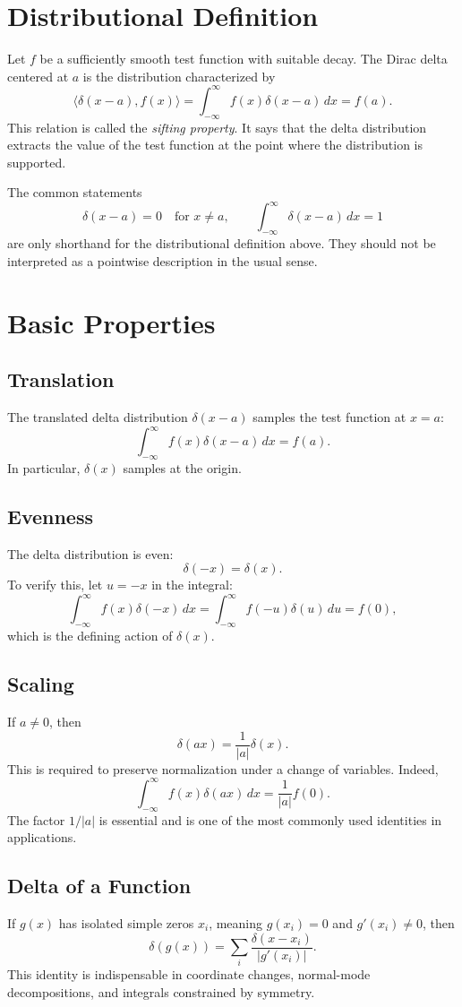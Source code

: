 \documentclass[12pt]{article}
\begin{document}
\section{Distributional Definition}
Let $f$ be a sufficiently smooth test function with suitable decay. The Dirac delta centered at $a$ is the distribution characterized by
\[
\langle \delta(x-a),f(x)\rangle = \int_{-\infty}^{\infty} f(x)\delta(x-a)\,dx = f(a).
\]
This relation is called the \emph{sifting property}. It says that the delta distribution extracts the value of the test function at the point where the distribution is supported.

The common statements
\[
\delta(x-a)=0 \quad \text{for } x\neq a,
\qquad
\int_{-\infty}^{\infty}\delta(x-a)\,dx=1
\]
are only shorthand for the distributional definition above. They should not be interpreted as a pointwise description in the usual sense.

\section{Basic Properties}

\subsection{Translation}
The translated delta distribution $\delta(x-a)$ samples the test function at $x=a$:
\[
\int_{-\infty}^{\infty} f(x)\delta(x-a)\,dx=f(a).
\]
In particular, $\delta(x)$ samples at the origin.

\subsection{Evenness}
The delta distribution is even:
\[
\delta(-x)=\delta(x).
\]
To verify this, let $u=-x$ in the integral:
\[
\int_{-\infty}^{\infty} f(x)\delta(-x)\,dx
=
\int_{-\infty}^{\infty} f(-u)\delta(u)\,du
=
f(0),
\]
which is the defining action of $\delta(x)$.

\subsection{Scaling}
If $a\neq 0$, then
\[
\delta(ax)=\frac{1}{|a|}\delta(x).
\]
This is required to preserve normalization under a change of variables. Indeed,
\[
\int_{-\infty}^{\infty} f(x)\delta(ax)\,dx
=
\frac{1}{|a|}f(0).
\]
The factor $1/|a|$ is essential and is one of the most commonly used identities in applications.

\subsection{Delta of a Function}
If $g(x)$ has isolated simple zeros $x_i$, meaning $g(x_i)=0$ and $g'(x_i)\neq 0$, then
\[
\delta(g(x))=\sum_i \frac{\delta(x-x_i)}{|g'(x_i)|}.
\]
This identity is indispensable in coordinate changes, normal-mode decompositions, and integrals constrained by symmetry.
\end{document}
